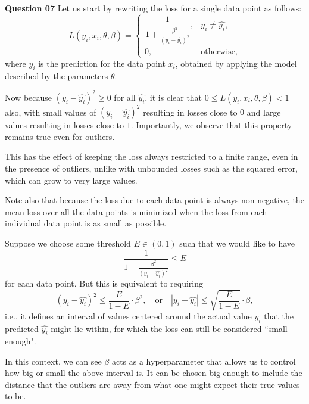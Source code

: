 \documentclass{article}[a4paper]
\begin{document}
	\textbf{Question 07} Let us start by rewriting the loss for a single data point as follows: \[
		L\left(y_i, x_i, \theta, \beta\right)
		=
		\begin{cases}
			\dfrac{1}{1 + \frac{\beta^2}{\left(y_i - \hat{y_i}\right)^2}},	& y_i \ne \hat{y_i}, \\
			0,																& \text{otherwise},
		\end{cases}
	\] where $\hat{y_i}$ is the prediction for the data point $x_i$, obtained by applying the model described by the parameters $\theta$.
	\newline
	
	Now because $\left(y_i - \hat{y_i}\right)^2 \geq 0$ for all $\hat{y_i}$, it is clear that
	$0 \leq L\left(y_i, x_i, \theta, \beta\right) < 1$ also, with small values of $\left(y_i - \hat{y_i}\right)^2$
	resulting in losses close to $0$ and large values resulting in losses close to $1$. Importantly, we observe that this property
	remains true even for outliers.
	\newline

	This has the effect of keeping the loss always restricted to a finite range, even in the presence of outliers,
	unlike with unbounded losses such as the squared error, which can grow to very large values.
	\newline
	
	Note also that because the loss due to each data point is always non-negative, the mean loss over all the data points is minimized
	when the loss from each individual data point is as small as possible.
	\newline
	
	Suppose we choose some threshold $E \in (0, 1)$ such that we would like to have \[
		\dfrac{1}{1 + \frac{\beta^2}{\left(y_i - \hat{y_i}\right)^2}} \leq E
	\] for each data point. But this is equivalent to requiring \[
		\left(y_i - \hat{y_i}\right)^2 \leq \dfrac{E}{1 - E} \cdot \beta^2,
		\quad \text{or} \quad
		\left|y_i - \hat{y_i}\right| \leq \sqrt{\dfrac{E}{1 - E}} \cdot \beta,
	\] i.e., it defines an interval of values centered around the actual value $y_i$ that the
	predicted $\hat{y_i}$ might lie within, for which the loss can still be considered ``small enough".
	\newline
	
	In this context, we can see $\beta$ acts as a hyperparameter that allows us to control how big or small the above interval is. It
	can be chosen big enough to include the distance that the outliers are away from what one might expect their true values to be.
	\newline
\end{document}
